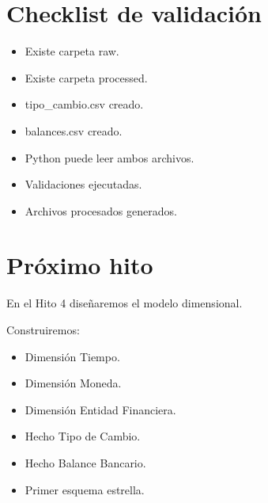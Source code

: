 \section{Checklist de validación}

\begin{itemize}
\item[$\Box$] Existe carpeta raw.
\item[$\Box$] Existe carpeta processed.
\item[$\Box$] tipo\_cambio.csv creado.
\item[$\Box$] balances.csv creado.
\item[$\Box$] Python puede leer ambos archivos.
\item[$\Box$] Validaciones ejecutadas.
\item[$\Box$] Archivos procesados generados.
\end{itemize}

\section{Próximo hito}

En el Hito 4 diseñaremos el modelo dimensional.

Construiremos:

\begin{itemize}
\item Dimensión Tiempo.
\item Dimensión Moneda.
\item Dimensión Entidad Financiera.
\item Hecho Tipo de Cambio.
\item Hecho Balance Bancario.
\item Primer esquema estrella.
\end{itemize}
